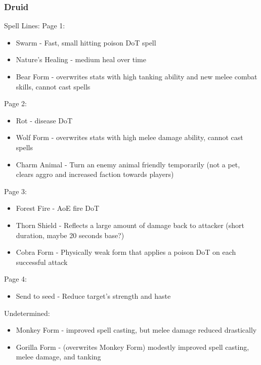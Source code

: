 \documentclass{article}
\begin{document}
\subsubsection{Druid}
Spell Lines:
Page 1:
\begin{itemize}
    \item Swarm - Fast, small hitting poison DoT spell 
    \item Nature's Healing - medium heal over time
    \item Bear Form - overwrites stats with high tanking ability and new melee combat skills, cannot cast spells
    
\end{itemize}

Page 2:
\begin{itemize}
    \item Rot - disease DoT
    \item Wolf Form - overwrites stats with high melee damage ability, cannot cast spells
    \item Charm Animal - Turn an enemy animal friendly temporarily (not a pet, clears aggro and increased faction towards players)
    
\end{itemize}

Page 3:
\begin{itemize}
    \item Forest Fire - AoE fire DoT
    \item Thorn Shield - Reflects a large amount of damage back to attacker (short duration, maybe 20 seconds base?)
    \item Cobra Form - Physically weak form that applies a poison DoT on each successful attack
    
\end{itemize}

Page 4:
\begin{itemize}
    \item Send to seed - Reduce target's strength and haste
\end{itemize}

Undetermined:
\begin{itemize}
    \item Monkey Form - improved spell casting, but melee damage reduced drastically
    \item Gorilla Form - (overwrites Monkey Form) modestly improved spell casting, melee damage, and tanking
    
\end{itemize}
\end{document}
